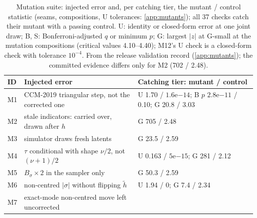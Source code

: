 \begin{table}[tbp]
  \centering
  \caption{Mutation suite: injected error and, per catching tier, the mutant / control statistic
    (seams, compositions, U tolerances: \cref{app:mutants}); all 37 checks catch their mutant with a
    passing control. U: identity or closed-form error at one joint draw; B, S: Bonferroni-adjusted $q$
    or minimum $p$; G: largest $|z|$ at G-small at the mutation compositions (critical values
    4.10--4.40); M12's U check is a closed-form check with tolerance $10^{-4}$. From the release
    validation record (\cref{app:mutants}); the committed evidence differs only for M2 (702 / 2.48).}
  \label{tab:Tab7}
  \footnotesize
  \begin{tabular}{@{}l p{} p{}@{}}
    \toprule
    ID & Injected error & Catching tier: mutant / control \\
    \midrule
    M1 & CCM-2019 triangular step, not the corrected one
       & U 1.70 / $1.6\mathrm{e}{-14}$; B $p$ $2.8\mathrm{e}{-11}$ / 0.10; G 20.8 / 3.03 \\
    M2 & stale indicators: carried over, drawn after $h$
       & G 705 / 2.48 \\
    M3 & simulator draws fresh latents
       & G 23.5 / 2.59 \\
    M4 & $\tau$ conditional with shape $\nu/2$, not $(\nu + 1)/2$
       & U 0.163 / $5\mathrm{e}{-15}$; G 281 / 2.12 \\
    M5 & $B_\sigma \times 2$ in the sampler only
       & G 50.3 / 2.59 \\
    M6 & non-centred $|\sigma|$ without flipping $\tilde h$
       & U 1.94 / 0; G 7.4 / 2.34 \\
    M7 & exact-mode non-centred move left uncorrected

\end{tabular}
\end{table}
